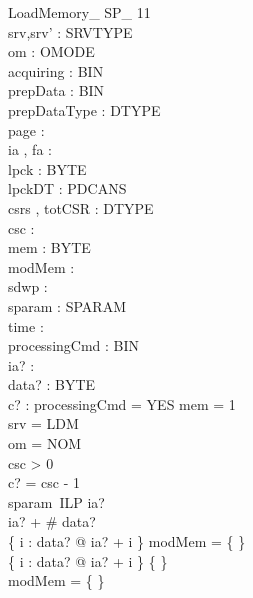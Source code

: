 \begin{schema}{LoadMemory\_ SP\_ 11}\\
 srv,srv' : SRVTYPE \\
 om : OMODE \\
 acquiring : BIN \\
 prepData : BIN \\
 prepDataType : DTYPE \\
 page : \nat \\
 ia , fa : \nat \\
 lpck : \seq BYTE \\
 lpckDT : PDCANS \\
 csrs , totCSR : DTYPE \fun \nat \\
 csc : \nat \\
 mem : \nat \pfun BYTE \\
 modMem : \power \nat \\
 sdwp : \nat \\
 sparam : SPARAM \fun \nat \\
 time : \nat \\
 processingCmd : BIN \\
 ia? : \nat \\
 data? : \seq BYTE \\
 c? : \nat 
\where
 processingCmd = YES \land \dom mem = 1  \\
 srv = LDM \\
 om = NOM \\
 csc > 0 \\
 c? = csc - 1 \\
 sparam~ILP \leq ia? \\
 ia? + \# data?   \\
 \{ i : \dom data? @ ia? + i \} \cap modMem = \{ \} \\
 \{ i : \dom data? @ ia? + i \} \neq \{ \} \\
 modMem = \{ \}
\end{schema}


